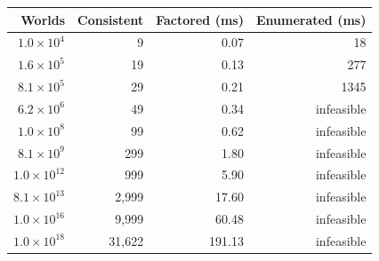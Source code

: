 \begin{tabular}{rrrr}
\toprule
Worlds & Consistent & Factored (ms) & Enumerated (ms) \\
\midrule
$1.0\times10^{4}$ & 9 & 0.07 & 18 \\
$1.6\times10^{5}$ & 19 & 0.13 & 277 \\
$8.1\times10^{5}$ & 29 & 0.21 & 1345 \\
$6.2\times10^{6}$ & 49 & 0.34 & infeasible \\
$1.0\times10^{8}$ & 99 & 0.62 & infeasible \\
$8.1\times10^{9}$ & 299 & 1.80 & infeasible \\
$1.0\times10^{12}$ & 999 & 5.90 & infeasible \\
$8.1\times10^{13}$ & 2,999 & 17.60 & infeasible \\
$1.0\times10^{16}$ & 9,999 & 60.48 & infeasible \\
$1.0\times10^{18}$ & 31,622 & 191.13 & infeasible \\
\bottomrule
\end{tabular}
